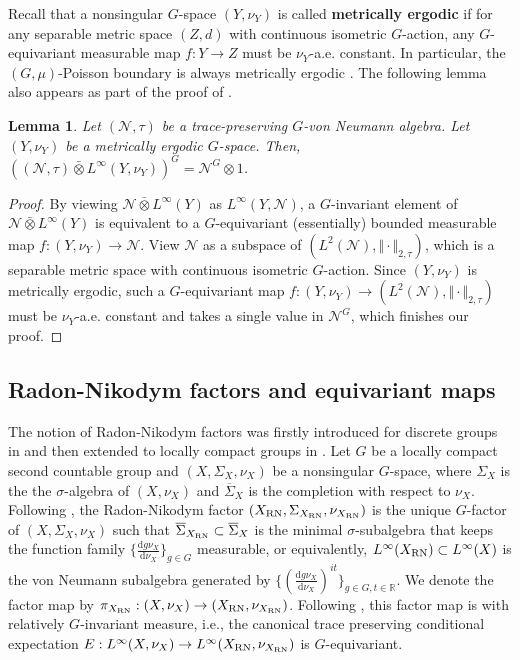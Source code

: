 \documentclass[12pt]{amsart}
\newcommand{\R}{{\mathbb R}}
\newcommand{\cN}{{\mathcal N}}
\newcommand{\RN}{{\rm RN}}
\def\d{\mathrm{d}}
\newtheorem{lemma}[thm]{Lemma}
\theoremstyle{definition}
\begin{document}
Recall that a nonsingular $G$-space $(Y,\nu_Y)$ is called \textbf{metrically ergodic} if for any separable metric space $(Z,d)$ with continuous isometric $G$-action, any $G$-equivariant measurable map $f:Y\to Z$ must be $\nu_Y$-a.e. constant. In particular, the $(G,\mu)$-Poisson boundary is always metrically ergodic \cite[Theorem 2.7]{BF14}. The following lemma also appears as part of the proof of \cite[ Proposition 4.17]{bader2022charmenability}.

\begin{lemma}
\label{lem:metric ergodic}
 Let $(\mathcal{N},\tau)$ be a trace-preserving $G$-von Neumann algebra. Let $(Y,\nu_Y)$ be a metrically ergodic $G$-space. Then, 
 $((\mathcal{N},\tau)\bar{\otimes}L^{\infty}(Y,\nu_Y))^G=\cN^G\otimes 1$.
\end{lemma}
\begin{proof}
By viewing $\mathcal{N}\bar{\otimes} L^\infty(Y)$ as $L^\infty(Y,\mathcal{N})$, a $G$-invariant element of $\mathcal{N}\bar{\otimes} L^\infty(Y)$ is equivalent to a $G$-equivariant (essentially) bounded measurable map $f:(Y,\nu_Y)\to\mathcal{N}$. View $\mathcal{N}$ as a subspace of $(L^2(\mathcal{N}),\Vert\cdot\Vert_{2,\tau})$, which is a separable metric space with continuous isometric $G$-action. Since $(Y,\nu_Y)$ is metrically ergodic, such a $G$-equivariant map $f:(Y,\nu_Y)\to(L^2(\mathcal{N}),\Vert\cdot\Vert_{2,\tau})$ must be $\nu_Y$-a.e. constant and takes a single value in $\cN^G$, which finishes our proof. 
\end{proof}

\subsection{Radon-Nikodym factors and equivariant maps}\label{Preliminaries:RN factor}
The notion of Radon-Nikodym factors was firstly introduced for discrete groups in \cite{KV83} and then extended to locally compact groups in \cite{NZ00}. Let $G$ be a locally compact second countable group and $(X,\Sigma_X,\nu_X)$ be a nonsingular $G$-space, where $\Sigma_X$ is the the $\sigma$-algebra of $(X,\nu_X)$ and $\overline{\Sigma}_X$ is the completion with respect to $\nu_X$. Following \cite[Definition 1.12]{NZ00}, the Radon-Nikodym factor $(X_\RN,\Sigma_{X_\RN},\nu_{X_\RN})$ is the unique $G$-factor of $(X,\Sigma_X,\nu_X)$ such that $\overline{\Sigma}_{X_\RN}\subset\overline{\Sigma}_X$ is the minimal $\sigma$-subalgebra that keeps the function family $\{\frac{\d g\nu_X}{\d\nu_X}\}_{g\in G}$ measurable, or equivalently, $L^\infty(X_\RN)\subset L^\infty(X)$ is the von Neumann subalgebra generated by $\{(\frac{\d g\nu_X}{\d\nu_X})^{it}\}_{g\in G,t\in\R}$. We denote the factor map by $\pi_{X_\RN}:(X,\nu_X)\to(X_\RN,\nu_{X_\RN})$. Following \cite{NZ00}, this factor map is with relatively $G$-invariant measure, i.e., the canonical trace preserving conditional expectation $E:L^\infty(X,\nu_X)\to L^\infty(X_\RN,\nu_{X_\RN})$ is $G$-equivariant.
\end{document}
